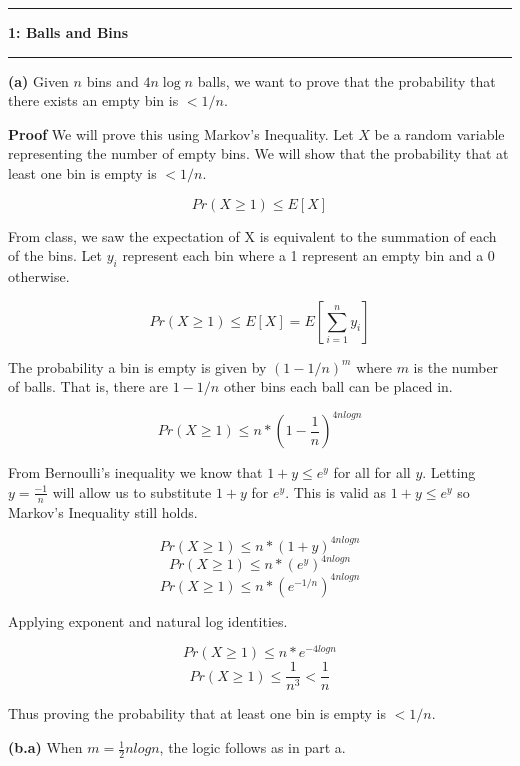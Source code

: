 \documentclass[11pt]{article}
\newcommand\question[2]{\vspace{.25in}\hrule\textbf{#1: #2}\vspace{.5em}\hrule\vspace{.10in}}
\renewcommand\part[1]{\vspace{.10in}\textbf{(#1)}}
\begin{document}
\raggedright
\newcommand\NAME{Jake Pitkin}  %
\newcommand\UID{u0891770}     %
\newcommand\HWNUM{5}              %

\question{1}{Balls and Bins}

\part{a} Given $n$ bins and $4 n \log n$ balls, we want to prove that the probability that there exists an empty bin is $< 1/n$.

\textbf{Proof} We will prove this using Markov's Inequality. Let $X$ be a random variable representing the number of empty bins. We will show that the probability that at least one bin is empty is $< 1/n$.

$$Pr(X \geq 1) \leq E[X]$$

From class, we saw the expectation of X is equivalent to the summation of each of the bins. Let $y_i$ represent each bin where a 1 represent an empty bin and a 0 otherwise.

$$Pr(X \geq 1) \leq E[X] = E[\sum_{i = 1}^n y_i]$$

The probability a bin is empty is given by $(1 - 1/n)^m$ where $m$ is the number of balls. That is, there are $1 - 1/n$ other bins each ball can be placed in. 

$$Pr(X \geq 1) \leq n * (1 - \frac{1}{n})^{4 n log n}$$

From Bernoulli's inequality we know that $1 + y \leq e^y$ for all for all $y$. Letting $y = \frac{-1}{n}$ will allow us to substitute $1 + y$ for $e^y$. This is valid as $1 + y \leq e^y$ so Markov's Inequality still holds.

$$Pr(X \geq 1) \leq n * (1 + y)^{4 n log n}$$
$$Pr(X \geq 1) \leq n * (e^{y})^{4 n log n}$$
$$Pr(X \geq 1) \leq n * (e^{-1/n})^{4 n log n}$$

Applying exponent and natural log identities.

$$Pr(X \geq 1) \leq n * e^{-4 log n}$$
$$Pr(X \geq 1) \leq \frac{1}{n^3} < \frac{1}{n}$$

Thus proving the probability that at least one bin is empty is $< 1/n$.

\part{b.a} When $m = \frac{1}{2} n log n$, the logic follows as in part a.
\end{document}

